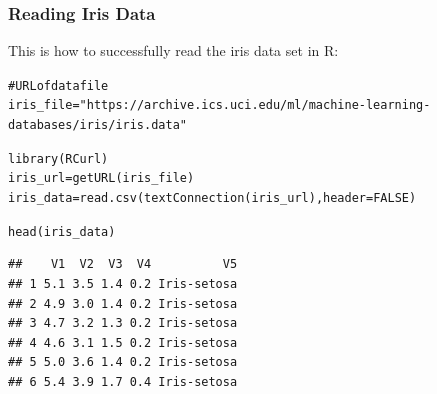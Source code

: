 \documentclass{beamer}\usepackage[]{graphicx}\usepackage[]{color}
\makeatletter
\newcommand{\hlnum}[1]{\textcolor[rgb]{0.063,0.58,0.627}{#1}}%
\newcommand{\hlstr}[1]{\textcolor[rgb]{0.063,0.58,0.627}{#1}}%
\newcommand{\hlcom}[1]{\textcolor[rgb]{0.588,0.588,0.588}{#1}}%
\newcommand{\hlstd}[1]{\textcolor[rgb]{0.196,0.196,0.196}{#1}}%
\newcommand{\hlkwb}[1]{\textcolor[rgb]{0.627,0,0.314}{#1}}%
\newcommand{\hlkwc}[1]{\textcolor[rgb]{0,0.631,0.314}{#1}}%
\newcommand{\hlkwd}[1]{\textcolor[rgb]{0.78,0.227,0.412}{#1}}%
\newenvironment{kframe}{%
 \def\at@end@of@kframe{}%
 \ifinner\ifhmode%
  \def\at@end@of@kframe{\end{minipage}}%
  \begin{minipage}{\columnwidth}%
 \fi\fi%
 \def\FrameCommand##1{\hskip\@totalleftmargin \hskip-\fboxsep
 \colorbox{shadecolor}{##1}\hskip-\fboxsep
     \hskip-\linewidth \hskip-\@totalleftmargin \hskip\columnwidth}%
 \MakeFramed {\advance\hsize-\width
   \@totalleftmargin\z@ \linewidth\hsize
   \@setminipage}}%
 {\par\unskip\endMakeFramed%
 \at@end@of@kframe}
\newenvironment{knitrout}{}{} %
\makeatother
\begin{document}
\begin{frame}[fragile]
\frametitle{Reading Iris Data}

This is how to successfully read the iris data set in R:
\begin{knitrout}\tiny
{}\color{fgcolor}\begin{kframe}
\begin{alltt}
\hlcom{# URL of data file}
\hlstd{iris_file} \hlkwb{=} \hlstr{"https://archive.ics.uci.edu/ml/machine-learning-databases/iris/iris.data"}

\hlkwd{library}\hlstd{(RCurl)}
\hlstd{iris_url} \hlkwb{=} \hlkwd{getURL}\hlstd{(iris_file)}
\hlstd{iris_data} \hlkwb{=} \hlkwd{read.csv}\hlstd{(}\hlkwd{textConnection}\hlstd{(iris_url),} \hlkwc{header} \hlstd{=} \hlnum{FALSE}\hlstd{)}
\end{alltt}
\end{kframe}
\end{knitrout}

\begin{knitrout}\tiny
{}\color{fgcolor}\begin{kframe}
\begin{alltt}
\hlkwd{head}\hlstd{(iris_data)}
\end{alltt}
\begin{verbatim}
##    V1  V2  V3  V4          V5
## 1 5.1 3.5 1.4 0.2 Iris-setosa
## 2 4.9 3.0 1.4 0.2 Iris-setosa
## 3 4.7 3.2 1.3 0.2 Iris-setosa
## 4 4.6 3.1 1.5 0.2 Iris-setosa
## 5 5.0 3.6 1.4 0.2 Iris-setosa
## 6 5.4 3.9 1.7 0.4 Iris-setosa
\end{verbatim}
\end{kframe}
\end{knitrout}

\end{frame}

\end{document}
